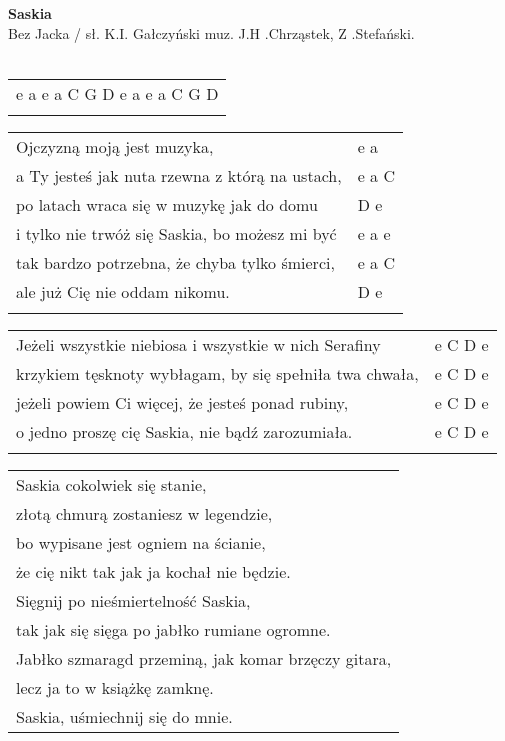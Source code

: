 \documentclass[a5paper]{article}
\begin{document}


\noindent
\fontsize{12pt}{15pt}\selectfont
\textbf{Saskia} \\
\fontsize{8pt}{10pt}\selectfont
Bez Jacka / sł. K.I. Gałczyński muz. J.H .Chrząstek, Z .Stefański. \\ \\
\fontsize{10pt}{12pt}\selectfont
{}
\begin{tabular}{@{}p{9.50cm}@{}}
\noindent
e a e a C G D e a e a C G D \\ \\
\end{tabular}

\noindent
\begin{tabular}{@{}p{9.50cm}p{3cm}@{}}
Ojczyzną moją jest muzyka, & e a \\
a Ty jesteś jak nuta rzewna z którą na ustach, & e a C \\
po latach wraca się w muzykę jak do domu & D e \\
i tylko nie trwóż się Saskia, bo możesz mi być & e a e \\
tak bardzo potrzebna, że chyba tylko śmierci, & e a C \\
ale już Cię nie oddam nikomu. & D e \\ \\
\end{tabular}

\noindent
\begin{tabular}{@{}p{9.50cm}p{3cm}@{}}
Jeżeli wszystkie niebiosa i wszystkie w nich Serafiny & e C D e \\
krzykiem tęsknoty wybłagam, by się spełniła twa chwała, & e C D e \\
jeżeli powiem Ci więcej, że jesteś ponad rubiny, & e C D e \\
o jedno proszę cię Saskia, nie bądź zarozumiała. & e C D e \\ \\
\end{tabular}

\noindent
\begin{tabular}{@{}p{9.50cm}@{}}
Saskia cokolwiek się stanie, \\
złotą chmurą zostaniesz w legendzie, \\
bo wypisane jest ogniem na ścianie, \\
że cię nikt tak jak ja kochał nie będzie. \\
Sięgnij po nieśmiertelność Saskia, \\
tak jak się sięga po jabłko rumiane ogromne. \\
Jabłko szmaragd przeminą, jak komar brzęczy gitara, \\
lecz ja to w książkę zamknę. \\
Saskia, uśmiechnij się do mnie.
\end{tabular}
\end{document}
